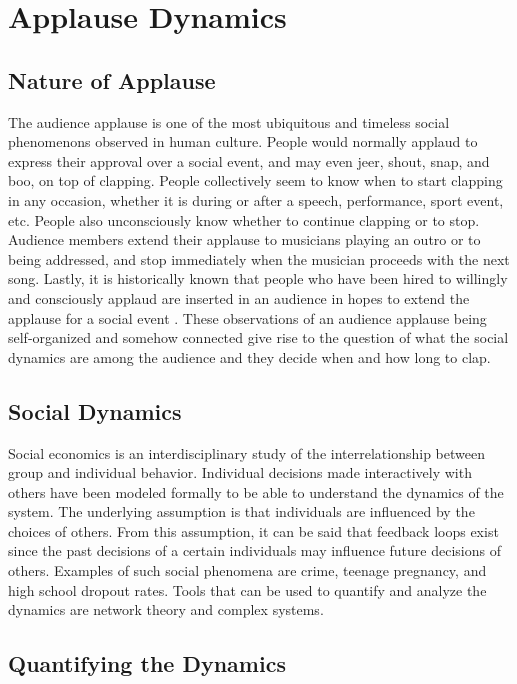 \chapter{Applause Dynamics}

\section{Nature of Applause}

\hspace{\parindent} 
The audience applause is one of the most ubiquitous and timeless social phenomenons observed in human culture.
People would normally applaud to express their approval over a social event, and may even jeer, shout, snap, and boo, on top of clapping.
People collectively seem to know when to start clapping in any occasion, whether it is during or after a speech, performance, sport event, etc.
People also unconsciously know whether to continue clapping or to stop. 
Audience members extend their applause to musicians playing an outro or to being addressed, and stop immediately when the musician proceeds with the next song.
Lastly, it is historically known that people who have been hired to willingly and consciously applaud are inserted in an audience in hopes to extend the applause for a social event \cite{claque_origin}.
These observations of an audience applause being self-organized and somehow connected give rise to the question of what the social dynamics are among the audience and they decide when and how long to clap.

\section{Social Dynamics}
Social economics is an interdisciplinary study of the interrelationship between group and individual behavior. 
Individual decisions made interactively with others have been modeled formally to be able to understand the dynamics of the system. 
The underlying assumption is that individuals are influenced by the choices of others. 
From this assumption, it can be said that feedback loops exist since the past decisions of a certain individuals may influence future decisions of others. Examples of such social phenomena are crime, teenage pregnancy, and high school dropout rates.\cite{socialDynamics}\cite{peerEffects}
Tools that can be used to quantify and analyze the dynamics are network theory and complex systems.

\section{Quantifying the Dynamics}
